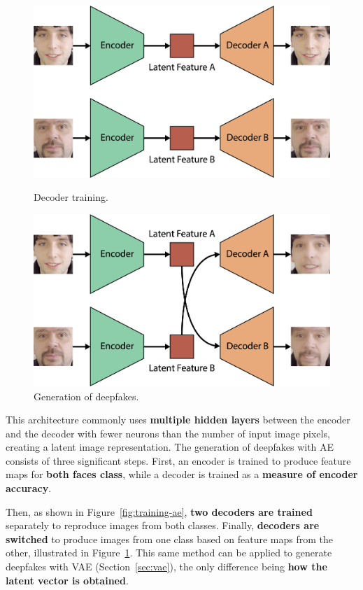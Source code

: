 \documentclass[preprint]{elsarticle}
\begin{document}
\begin{figure}[t]
	\centering
    \includegraphics[scale=0.6, keepaspectratio]{img/background_img/Training-AE.png}
    \caption{Decoder training.}\label{fig:training-ae}
	\includegraphics[scale=0.6, keepaspectratio]{img/background_img/Generation-AE2.png}
	\caption{Generation of deepfakes.}\label{fig:generation-ae}
\end{figure}


This architecture commonly uses \textbf{multiple hidden layers} between the encoder and the decoder 
with fewer neurons than the number of input image pixels, creating a latent image representation. 
The generation of deepfakes with AE consists of three significant steps.
First, an encoder is trained to produce feature maps for \textbf{both faces class}, while a decoder is trained as a \textbf{measure of encoder accuracy}. 

Then, as shown in Figure~\ref{fig:training-ae}, \textbf{two decoders are trained} separately to reproduce images from both classes. Finally, \textbf{decoders are switched} to produce images from one class based on feature maps from the other, illustrated in Figure~\ref{fig:generation-ae}. This same method can be applied to generate deepfakes with VAE (Section~\ref{sec:vae}), the only difference being \textbf{how the latent vector is obtained}.
\end{document}
